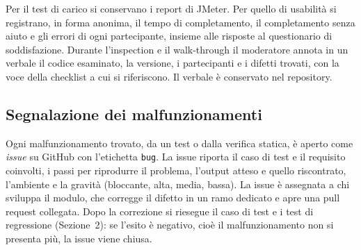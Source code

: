 Per il test di carico si conservano i report di JMeter. Per quello di usabilità si registrano, in forma anonima, il tempo di completamento, il completamento senza aiuto e gli errori di ogni partecipante, insieme alle risposte al questionario di soddisfazione.
Durante l'inspection e il walk-through il moderatore annota in un verbale il codice esaminato, la versione, i partecipanti e i difetti trovati, con la voce della checklist a cui si riferiscono. Il verbale è conservato nel repository.

\subsection{Segnalazione dei malfunzionamenti}

Ogni malfunzionamento trovato, da un test o dalla verifica statica, è aperto come \emph{issue} su GitHub con l'etichetta \texttt{bug}. La issue riporta il caso di test e il requisito coinvolti, i passi per riprodurre il problema, l'output atteso e quello riscontrato, l'ambiente e la gravità (bloccante, alta, media, bassa). La issue è assegnata a chi sviluppa il modulo, che corregge il difetto in un ramo dedicato e apre una pull request collegata. Dopo la correzione si riesegue il caso di test e i test di regressione (Sezione~2): se l'esito è negativo, cioè il malfunzionamento non si presenta più, la issue viene chiusa.
